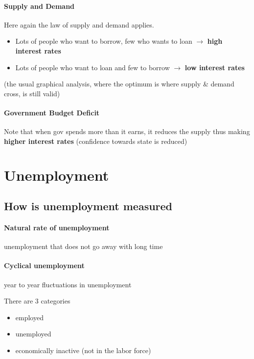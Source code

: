 \documentclass[a4paper,titlepage] {scrartcl}
\begin{document}
\paragraph{Supply and Demand} %
\label{par:supply_and_demand}
Here again the law of supply and demand applies.

\begin{itemize}
	\item Lots of people who want to borrow, few who wants to loan $\rightarrow$ \textbf{high interest rates}
	\item Lots of people who want to loan and few to borrow $\rightarrow$ \textbf{low interest rates}
\end{itemize}
(the usual graphical analysis, where the optimum is where supply \& demand cross, is still valid) 

\paragraph{Government Budget Deficit} %
\label{par:government_budget_deficit}
Note that when gov spends more than it earns, it reduces the supply thus making \textbf{higher interest rates} (confidence towards state is reduced)

\section{Unemployment}
\subsection{How is unemployment measured}
\paragraph{Natural rate of unemployment}
unemployment that does not go away with long time

\paragraph{Cyclical unemployment}
year to year fluctuations in unemployment

There are 3 categories
\begin{itemize}
	\item employed
	\item unemployed
	\item economically inactive (not in the labor force)
\end{itemize}
\end{document}
